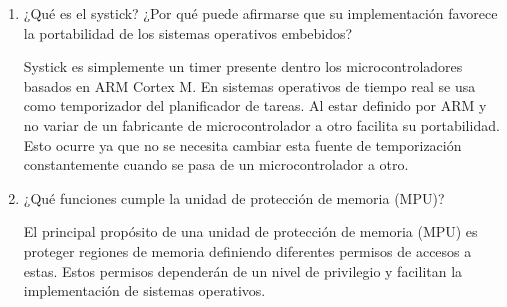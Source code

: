 \documentclass[12pt, a4paper]{article}
\makeatletter
\newcommand\setItemnumber[1]{\setcounter{enum\romannumeral\@enumdepth}{\numexpr#1-1\relax}}
\makeatother
\begin{document}
\begin{enumerate}
    
    \setItemnumber{17}
    \item ¿Qué es el systick? ¿Por qué puede afirmarse que su implementación favorece la portabilidad 
    de los sistemas operativos embebidos?
    
    Systick es simplemente un timer presente dentro los microcontroladores basados en ARM Cortex M. 
    En sistemas operativos de tiempo real se usa como temporizador del planificador de tareas. Al estar
    definido por ARM y no variar de un fabricante de microcontrolador a otro facilita
    su portabilidad. Esto ocurre ya que no se necesita cambiar esta fuente de temporización constantemente 
    cuando se pasa de un microcontrolador a otro.
    
    \setItemnumber{18}
    \item ¿Qué funciones cumple la unidad de protección de memoria (MPU)?
    
    El principal propósito de una unidad de protección de memoria (MPU) es proteger regiones de
    memoria definiendo diferentes permisos de accesos a estas. Estos permisos dependerán de un 
    nivel de privilegio y facilitan la implementación de sistemas operativos.
    
\end{enumerate}
\end{document}
